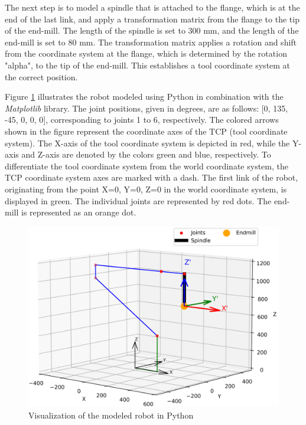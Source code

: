 The next step is to model a spindle that is attached to the flange, which is at the end of the last link, and apply a transformation matrix from the flange to the tip of the end-mill. The length of the spindle is set to 300 mm, and the length of the end-mill is set to 80 mm. The transformation matrix applies a rotation and shift from the coordinate system at the flange, which is determined by the rotation "alpha", to the tip of the end-mill. This establishes a tool coordinate system at the correct position.

Figure \ref{robotprog} illustrates the robot modeled using Python in combination with the \textit{Matplotlib} library. The joint positions, given in degrees, are as follows: [0, 135, -45, 0, 0, 0], corresponding to joints 1 to 6, respectively. The colored arrows shown in the figure represent the coordinate axes of the \acrshort{TCP} (tool coordinate system). The X-axis of the tool coordinate system is depicted in red, while the Y-axis and Z-axis are denoted by the colors green and blue, respectively. To differentiate the tool coordinate system from the world coordinate system, the TCP coordinate system axes are marked with a dash. The first link of the robot, originating from the point X=0, Y=0, Z=0 in the world coordinate system, is displayed in green. The individual joints are represented by red dots. The end-mill is represented as an orange dot.


 \begin{figure}[H]
	\centerline{\includegraphics[width=1\textwidth]{figures/robotprog.png}}
	\caption{Visualization of the modeled robot in Python}
	\label{robotprog}
\end{figure}


